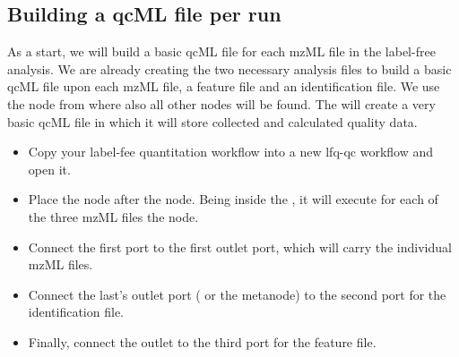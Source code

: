 \subsection{Building a qcML file per run}
\label{Building a qcML file per run}


As a start, we will build a basic qcML file for each mzML file in the label-free analysis. We are already creating the two necessary analysis files to build a basic qcML file upon each mzML file, a feature file and an identification file. We use the  node from  where also all other  nodes will be found. The  will create a very basic qcML file in which it will store collected and calculated quality data.

\begin{itemize} 
\item Copy your label-fee quantitation workflow into a new lfq-qc workflow and open it.
\item Place the  node after the  node. Being inside the , it will execute for each of the three mzML files the  node.
\item Connect the first  port to the first  outlet port, which will carry the individual mzML files.
\item Connect the last's  outlet port ( or the  metanode) to the second  port for the identification file.
\item Finally, connect the  outlet to the third  port for the feature file.
\end{itemize}

